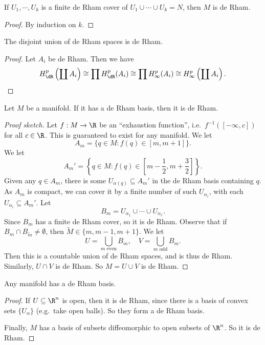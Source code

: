 \documentclass[a4paper]{article}
\begin{document}
\begin{cor}
  If $U_1,\cdots, U_k$ is a finite de Rham cover of $U_1 \cup \cdots \cup U_k = N$, then $M$ is de Rham.
\end{cor}

\begin{proof}
  By induction on $k$.
\end{proof}

\begin{prop}
  The disjoint union of de Rham spaces is de Rham.
\end{prop}

\begin{proof}
  Let $A_i$ be de Rham. Then we have
  \[
    H^p_{\dR}\left(\coprod A_i\right) \cong \prod H^p_{\dR}(A_i) \cong \prod H^p_\infty(A_i) \cong H^p_\infty\left(\coprod A_i\right).
  \]
\end{proof}
\begin{lemma}
  Let $M$ be a manifold. If it has a de Rham basis, then it is de Rham.
\end{lemma}

\begin{proof}[Proof sketch]
  Let $f: M \to \R$ be an ``exhaustion function'', i.e.\ $f^{-1}([-\infty, c])$ for all $c \in \R$. This is guaranteed to exist for any manifold. We let
  \[
    A_m = \{q \in M: f(q) \in [m, m + 1]\}.
  \]
  We let
  \[
    A_m' = \left\{q \in M: f(q) \in \left[m - \frac{1}{2}, m + \frac{3}{2}\right]\right\}.
  \]
  Given any $q \in A_m$, there is some $U_{\alpha(q)} \subseteq A_m'$ in the de Rham basis containing $q$. As $A_m$ is compact, we can cover it by a finite number of such $U_{\alpha_i}$, with each $U_{\alpha_i} \subseteq A_m'$. Let
  \[
    B_m = U_{\alpha_1} \cup \cdots \cup U_{\alpha_r}.
  \]
  Since $B_m$ has a finite de Rham cover, so it is de Rham. Observe that if $B_m \cap B_{\tilde{m}} \not= \emptyset$, then $\tilde{M} \in \{m, m - 1, m + 1\}$. We let
  \[
    U = \bigcup_{m\text{ even}} B_m,\quad V = \bigcup_{m \text{ odd}} B_m.
  \]
  Then this is a countable union of de Rham spaces, and is thus de Rham. Similarly, $U \cap V$ is de Rham. So $M = U \cup V$ is de Rham.
\end{proof}

\begin{thm}
  Any manifold has a de Rham basis.
\end{thm}

\begin{proof}
  If $U \subseteq \R^n$ is open, then it is de Rham, since there is a basis of convex sets $\{U_\alpha\}$ (e.g.\ take open balls). So they form a de Rham basis.

  Finally, $M$ has a basis of subsets diffeomorphic to open subsets of $\R^n$. So it is de Rham.
\end{proof}
\end{document}
